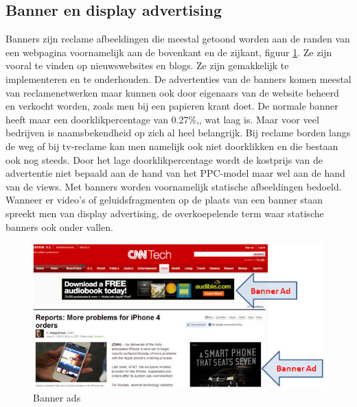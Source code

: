 \documentclass[pdftex,a4paper,12pt,twoside]{report}
\begin{document}
\subsection{Banner en display advertising }
\label{sec Banner en display advertising }
Banners zijn reclame afbeeldingen die meestal getoond worden aan de randen van een webpagina voornamelijk aan de bovenkant en de zijkant, figuur \ref{fig: Banner-Ads}. Ze zijn vooral te vinden op nieuwswebsites en blogs. Ze zijn gemakkelijk te implementeren en te onderhouden. De advertenties van de banners komen meestal van reclamenetwerken maar kunnen ook door eigenaars van de website beheerd en verkocht worden, zoals men bij een papieren krant doet. De normale banner heeft maar een doorklikpercentage van 0.27\%,\cite{Chaffey2016}, wat laag is. Maar voor veel bedrijven is naamsbekendheid op zich al heel belangrijk. Bij reclame borden langs de weg of bij tv-reclame kan men namelijk ook niet doorklikken en die bestaan ook nog steeds. Door het lage doorklikpercentage wordt de kostprijs van de advertentie niet bepaald aan de hand van het PPC-model maar wel aan de hand van de views. Met banners worden voornamelijk statische afbeeldingen bedoeld. Wanneer er video's of geluidsfragmenten op de plaats van een banner staan spreekt men van display advertising, de overkoepelende term waar statische banners ook onder vallen.
\begin{figure}[h!]
\centering
\includegraphics[width=12cm]{img/Banner-Ads}
\caption{Banner ads}
\label{fig: Banner-Ads}
\end{figure}
\end{document}
